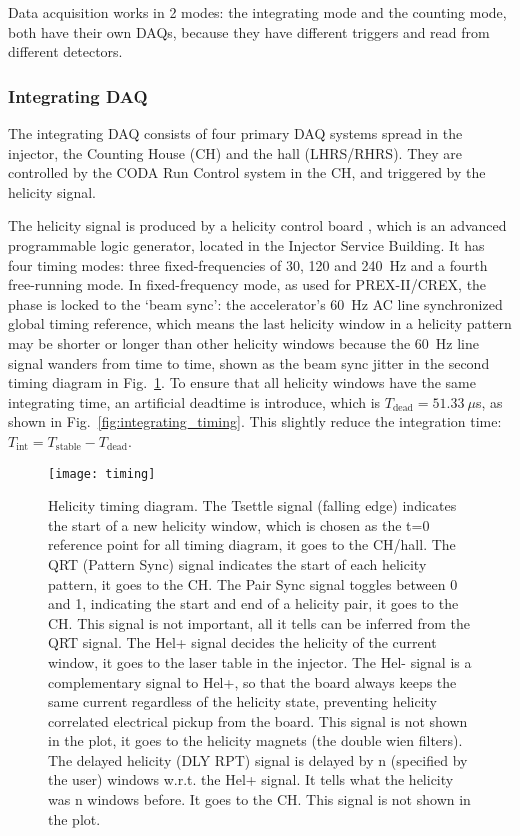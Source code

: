 Data acquisition works in 2 modes: the integrating mode and the counting mode,
both have their own DAQs, because they have different triggers and read from
different detectors.

\subsubsection{Integrating DAQ}
The integrating DAQ consists of four primary DAQ systems spread in the injector,
the Counting House (CH) and the hall (LHRS/RHRS). They are controlled by the
CODA Run Control system in the CH, and triggered by the helicity signal.

The helicity signal is produced by a helicity control board \cite{Hboard}, which 
is an advanced programmable logic generator, located in the Injector Service Building.
It has four timing modes: three fixed-frequencies of 30, 120 and 240~Hz
and a fourth free-running mode. In fixed-frequency mode, as used for PREX-II/CREX,
the phase is locked to the `beam sync': the accelerator's 60~Hz AC line synchronized 
global timing reference, which means the last helicity window in a helicity pattern
may be shorter or longer than other helicity windows because the 60~Hz line signal
wanders from time to time, shown as the beam sync jitter in the second timing diagram 
in Fig.~\ref{fig:timing}. To ensure that all helicity windows have the same integrating
time, an artificial deadtime is introduce, which is $T_{\text{dead}} = 51.33\ \mu$s,
as shown in Fig.~\ref{fig:integrating_timing}.
This slightly reduce the integration time: $T_{\text{int}} = T_{\text{stable}} - T_{\text{dead}}$.

\begin{figure}
    \centering
    \texttt{[image: timing]}
    \caption[Helicity timing diagram]
    {Helicity timing diagram. The Tsettle signal (falling edge) indicates 
    the start of a new helicity window, which is chosen as the t=0 reference
    point for all timing diagram, it goes to the CH/hall.
    The QRT (Pattern Sync) signal indicates the start of each helicity pattern,
    it goes to the CH. 
    The Pair Sync signal toggles between 0 and 1, indicating the start and end
    of a helicity pair, it goes to the CH. This signal is not important, all it
    tells can be inferred from the QRT signal.
    The Hel+ signal decides the helicity of the current window, it goes to the 
    laser table in the injector.
    The Hel- signal is a complementary signal to Hel+, so that the board always 
    keeps the same current regardless of the helicity state, preventing helicity 
    correlated electrical pickup from the board. This signal is not shown in the
    plot, it goes to the helicity magnets (the double wien filters).
    The delayed helicity (DLY RPT) signal is delayed by n (specified by the user) 
    windows w.r.t. the Hel+ signal.
    It tells what the helicity was n windows before. It goes to the CH. This
    signal is not shown in the plot.}
    \label{fig:timing}
\end{figure}

